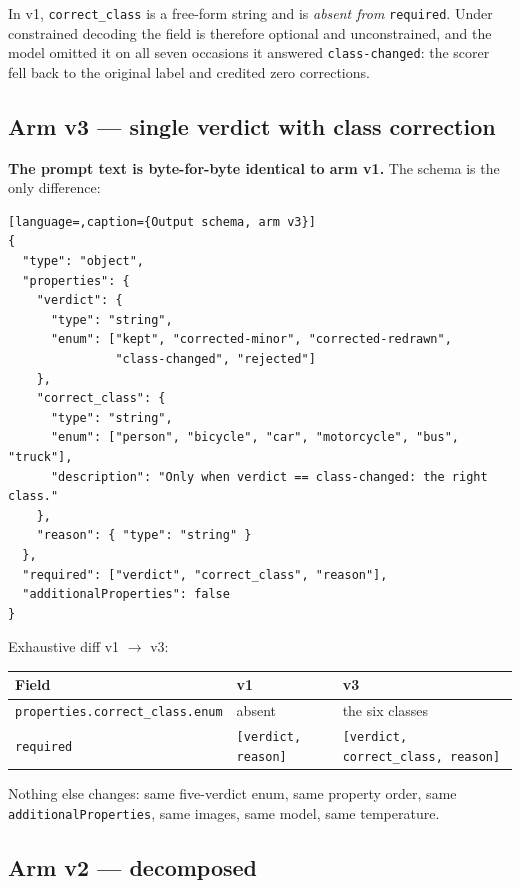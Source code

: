 \noindent
In v1, \texttt{correct\_class} is a free-form string and is \emph{absent from}
\texttt{required}. Under constrained decoding the field is therefore optional
and unconstrained, and the model omitted it on all seven occasions it answered
\texttt{class-changed}: the scorer fell back to the original label and credited
zero corrections.

\subsection{Arm v3 --- single verdict with class correction}

\textbf{The prompt text is byte-for-byte identical to arm v1.} The schema is the
only difference:

\begin{lstlisting}[language=,caption={Output schema, arm v3}]
{
  "type": "object",
  "properties": {
    "verdict": {
      "type": "string",
      "enum": ["kept", "corrected-minor", "corrected-redrawn",
               "class-changed", "rejected"]
    },
    "correct_class": {
      "type": "string",
      "enum": ["person", "bicycle", "car", "motorcycle", "bus", "truck"],
      "description": "Only when verdict == class-changed: the right class."
    },
    "reason": { "type": "string" }
  },
  "required": ["verdict", "correct_class", "reason"],
  "additionalProperties": false
}
\end{lstlisting}

\noindent
Exhaustive diff v1 $\to$ v3:

\begin{center}
\small
\begin{tabular}{lll}
\toprule
Field & v1 & v3 \\
\midrule
\texttt{properties.correct\_class.enum} & absent & the six classes \\
\texttt{required} & \texttt{[verdict, reason]} & \texttt{[verdict, correct\_class, reason]} \\
\bottomrule
\end{tabular}
\end{center}

\noindent
Nothing else changes: same five-verdict enum, same property order, same
\texttt{additionalProperties}, same images, same model, same temperature.

\subsection{Arm v2 --- decomposed}

